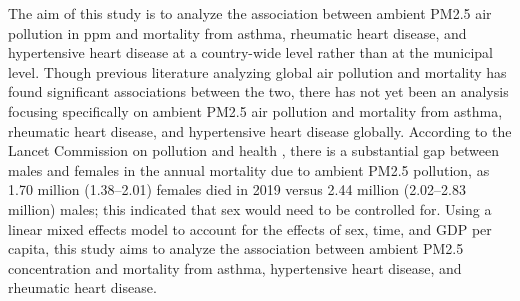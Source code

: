 \documentclass[12pt, letterpaper, twoside]{article}\usepackage[]{graphicx}\usepackage[]{xcolor}
\begin{document}
The aim of this study is to analyze
the association between ambient PM2.5 air pollution in ppm and mortality from
asthma, rheumatic heart disease, and hypertensive heart disease at a country-wide
level rather than at the municipal level. Though previous literature analyzing
global air pollution and mortality has found significant associations between
the two, there has not yet been an analysis focusing specifically on ambient
PM2.5 air pollution and mortality from asthma, rheumatic heart disease, and
hypertensive heart disease globally. According to the Lancet Commission on
pollution and health \citep{khojasteh2021long}, there is a substantial gap
between males and females in the annual mortality due to ambient PM2.5 pollution,
as 1.70 million (1.38–2.01) females died	in 2019 versus 2.44 million
(2.02–2.83 million) males; this indicated that sex would need to be controlled
for. Using a linear mixed effects model to account for the effects of sex, time,
and GDP per capita, this study aims to analyze the association between ambient
PM2.5 concentration and mortality from asthma, hypertensive heart disease, and
rheumatic heart disease.
\end{document}
